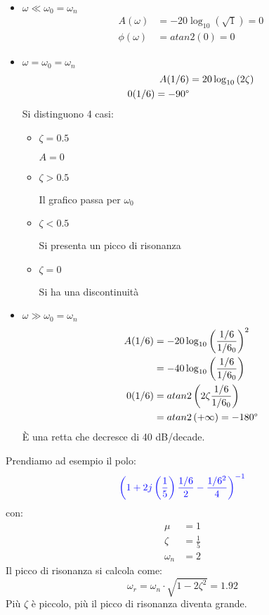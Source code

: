 \documentclass[a4paper]{article}
\begin{document}
\begin{itemize}
  \item \( \omega \ll \omega_0 = \omega_n \) 
    \[
    \begin{aligned}
      A(\omega) &= -20 \log_{10} \left( \sqrt{1} \right) = 0\\
      \phi(\omega) &= atan2\left( 0 \right) = 0
    \end{aligned}
    \] 

  \item \( \omega = \omega_0 = \omega_n \) 
    \[
      \begin{aligned}
        A(\omega) &= 20 \log_{10} \left( 2 \zeta \right)\\
        \phi(\omega) = -90\degree
      \end{aligned}
    \] 
    Si distinguono 4 casi:
    \begin{itemize}
      \item \( \zeta = 0.5 \) 

        $A = 0$

      \item \( \zeta > 0.5 \) 

        Il grafico passa per \( \omega_0 \) 

      \item \( \zeta < 0.5 \) 

        Si presenta un picco di risonanza

      \item \( \zeta = 0 \) 

        Si ha una discontinuità
    \end{itemize}

  \item \( \omega \gg \omega_0 = \omega_n \) 
    \[
    \begin{aligned}
      A(\omega) &= -20 \log_{10} \left( \frac{\omega}{\omega_0} \right)^2 \\
                &= -40 \log_{10} \left( \frac{\omega}{\omega_0} \right)\\
      \phi(\omega) &= atan2\left( 2 \zeta \frac{\omega}{\omega_0} \right)\\
                   &= atan2\left( +\infty \right) = -180\degree
    \end{aligned}
    \] 
    È una retta che decresce di 40 dB/decade.
\end{itemize}

Prendiamo ad esempio il polo:
\[
  \color{blue} \left( 1 + 2j \left( \frac{1}{5} \right) \frac{\omega}{2} - \frac{\omega^2}{4} \right)^{-1}
\] 
con:
\[
\begin{aligned}
  \mu &= 1\\
  \zeta &= \frac{1}{5}\\
  \omega_n &= 2
\end{aligned}
\] 
Il picco di risonanza si calcola come:
\[
  \omega_r = \omega_n \cdot \sqrt{1 - 2 \zeta^2} = 1.92
\] 
Più \( \zeta \) è piccolo, più il picco di risonanza diventa grande.
\end{document}
